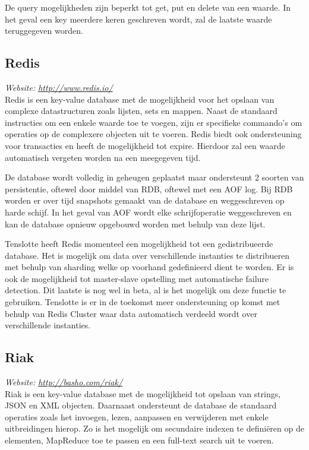 De query mogelijkheden zijn beperkt tot get, put en delete van een waarde. In het geval een key meerdere keren geschreven wordt, zal de laatste waarde teruggegeven worden. 

\subsection{Redis}
\textit{Website: \url{http://www.redis.io/}}\\
Redis is een key-value database met de mogelijkheid voor het opslaan van complexe datastructuren zoals lijsten, sets en mappen. Naast de standaard instructies om een enkele waarde toe te voegen, zijn er specifieke commando's om operaties op de complexere objecten uit te voeren. Redis biedt ook ondersteuning voor transacties en heeft de mogelijkheid tot expire. Hierdoor zal een waarde automatisch vergeten worden na een meegegeven tijd. 

De database wordt volledig in geheugen geplaatst maar ondersteunt 2 soorten van persistentie, oftewel door middel van RDB, oftewel met een AOF log. Bij RDB worden er over tijd snapshots gemaakt van de database en weggeschreven op harde schijf. In het geval van AOF wordt elke schrijfoperatie weggeschreven en kan de database opnieuw opgebouwd worden met behulp van deze lijst.

Tenslotte heeft Redis momenteel een mogelijkheid tot een gedistribueerde database. Het is mogelijk om data over verschillende instanties te distribueren met behulp van sharding welke op voorhand gedefinieerd dient te worden. Er is ook de mogelijkheid tot master-slave opstelling met automatische failure detection.
Dit laatste is nog wel in beta, al is het mogelijk om deze functie te gebruiken. Tenslotte is er in de toekomst meer ondersteuning op komst met behulp van Redis Cluster waar data automatisch verdeeld wordt over verschillende instanties. 

\subsection{Riak}
\textit{Website: \url{http://basho.com/riak/}}\\
Riak is een key-value database met de mogelijkheid tot opslaan van strings, JSON en XML objecten. Daarnaast ondersteunt de database de standaard operaties zoals het invoegen, lezen, aanpassen en verwijderen met enkele uitbreidingen hierop. Zo is het mogelijk om secundaire indexen te definiëren op de elementen, MapReduce toe te passen en een full-text search uit te voeren. 

